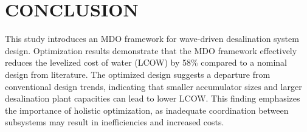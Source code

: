 \documentclass[twocolumn,10pt]{asme2e}
\begin{document}


\section{CONCLUSION}


This study introduces an MDO framework for wave-driven desalination system design. Optimization results demonstrate that the MDO framework effectively reduces the levelized cost of water (LCOW) by 58\% compared to a nominal design from literature. The optimized design suggests a departure from conventional design trends, indicating that smaller accumulator sizes and larger desalination plant capacities can lead to lower LCOW. This finding emphasizes the importance of holistic optimization, as inadequate coordination between subsystems may result in inefficiencies and increased costs.
\end{document}
